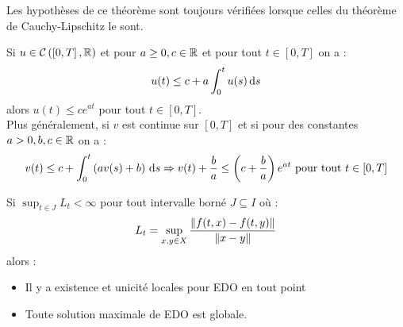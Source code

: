 \documentclass{cours}
\begin{document}
Les hypothèses de ce théorème sont toujours vérifiées lorsque celles du théorème de Cauchy-Lipschitz le sont. 


	\begin{lemma}[de Grönwall]
		Si $u \in \mathcal{C}\left(\left[0, T\right], \mathbb{R}\right)$ et pour $a \geq 0, c \in \mathbb{R}$ et pour tout $t \in \left[0, T\right]$ on a : 
		\[
			u(t) \leq c + a \int_{0}^{t} u(s) {\rm \, d} s
		\]
		alors $u(t) \leq ce^{at}$ pour tout $t \in \left[0, T\right]$. \\
		Plus généralement, si $v$ est continue sur $\left[0, T\right]$ et si pour des constantes $a > 0, b, c \in \mathbb{R}$ on a : 
		\[
			v(t) \leq c + \int_{0}^{t}\left(av(s) + b\right) {\rm \, d} s \Rightarrow v(t) + \frac{b}{a} \leq \left(c + \frac{b}{a}\right)e^{at} \text{ pour tout } t \in \left[0, T\right]
		\]
	\end{lemma}

	\begin{theorem}
		Si $\sup_{t \in J} L_{t} < \infty$ pour tout intervalle borné $J \subseteq I$ où :
		\[
			L_{t} = \sup_{x, y \in X} \frac{\left\lVert f(t, x) - f(t, y) \right\rVert}{\left\lVert x - y \right\rVert}
		\]
		alors : 
		\begin{itemize} 
			\item Il y a existence et unicité locales pour EDO en tout point
			\item Toute solution maximale de EDO est globale.
        \end{itemize}

    \end{theorem}
\end{document}
